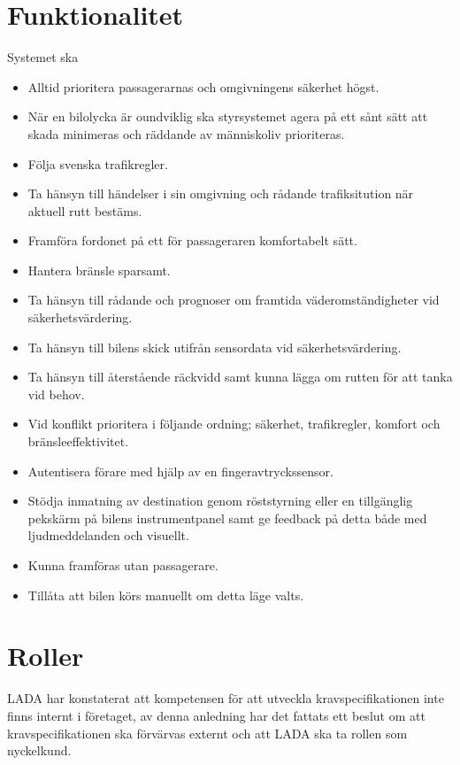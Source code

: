 \documentclass[10pt]{article}
\begin{document}
\section{Funktionalitet}
\sloppy
\noindent Systemet ska
\begin{itemize}
	\setlength\itemsep{0.1em}
	\item Alltid prioritera passagerarnas och omgivningens säkerhet högst.
	\item När en bilolycka är oundviklig ska styrsystemet agera på ett sånt sätt att skada minimeras och räddande av människoliv prioriteras.
	\item Följa svenska trafikregler.
	\item Ta hänsyn till händelser i sin omgivning och rådande trafiksitution  när aktuell rutt bestäms.
	\item Framföra fordonet på ett för passageraren komfortabelt sätt.
	\item Hantera bränsle sparsamt.
	\item Ta hänsyn till rådande och prognoser om framtida väderomständigheter vid säkerhetsvärdering.
	\item Ta hänsyn till bilens skick utifrån sensordata vid säkerhetsvärdering.
	\item Ta hänsyn till återstående räckvidd samt kunna lägga om rutten för att tanka vid behov.
	\item Vid konflikt prioritera i följande ordning; säkerhet, trafikregler, komfort och bränsleeffektivitet.
	\item Autentisera förare med hjälp av en fingeravtryckssensor.
	\item Stödja inmatning av destination genom röststyrning eller en tillgänglig pekskärm på bilens instrumentpanel samt ge feedback på detta både med ljudmeddelanden och visuellt.
	\item Kunna framföras utan passagerare.
	\item Tillåta att bilen körs manuellt om detta läge valts.
\end{itemize}


\section{Roller}
\sloppy
\noindent LADA har konstaterat att kompetensen för att utveckla kravspecifikationen inte finns internt i företaget, av denna anledning har det fattats ett beslut om att kravspecifikationen ska  förvärvas externt och att LADA ska ta rollen som nyckelkund.
\end{document}
